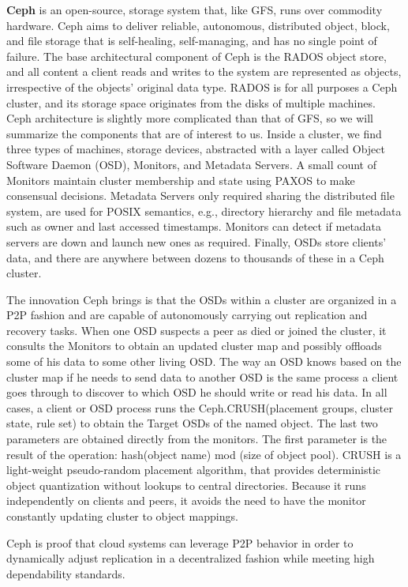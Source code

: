 \documentclass[runningheads]{llncs}
\begin{document}
\textbf{Ceph} is an open-source, storage system that, like GFS, runs over commodity hardware. Ceph aims to deliver reliable, autonomous, distributed object, block, and file storage that is self-healing, self-managing, and has no single point of failure. The base architectural component of Ceph is the RADOS object store, and all content a client reads and writes to the system are represented as objects, irrespective of the objects' original data type. RADOS is for all purposes a Ceph cluster, and its storage space originates from the disks of multiple machines. Ceph architecture is slightly more complicated than that of GFS, so we will summarize the components that are of interest to us. Inside a cluster, we find three types of machines, storage devices, abstracted with a layer called Object Software Daemon (OSD), Monitors, and Metadata Servers. A small count of Monitors maintain cluster membership and state using PAXOS \cite{paxos} to make consensual decisions. Metadata Servers only required sharing the distributed file system, are used for POSIX semantics, e.g., directory hierarchy and file metadata such as owner and last accessed timestamps. Monitors can detect if metadata servers are down and launch new ones as required. Finally, OSDs store clients' data, and there are anywhere between dozens to thousands of these in a Ceph cluster.

The innovation Ceph brings is that the OSDs within a cluster are organized in a P2P fashion and are capable of autonomously carrying out replication and recovery tasks. When one OSD suspects a peer as died or joined the cluster, it consults the Monitors to obtain an updated cluster map and possibly offloads some of his data to some other living OSD. The way an OSD knows based on the cluster map if he needs to send data to another OSD is the same process a client goes through to discover to which OSD he should write or read his data. In all cases, a client or OSD process runs the Ceph.CRUSH(placement groups, cluster state, rule set) to obtain the Target OSDs of the named object. The last two parameters are obtained directly from the monitors. The first parameter is the result of the operation: hash(object name) mod (size of object pool). CRUSH \cite{crush} is a light-weight pseudo-random placement algorithm, that provides deterministic object quantization without lookups to central directories. Because it runs independently on clients and peers, it avoids the need to have the monitor constantly updating cluster to object mappings.

Ceph is proof that cloud systems can leverage P2P behavior in order to dynamically adjust replication in a decentralized fashion while meeting high dependability standards. \cite{ceph, ceph_benchmarks}
\end{document}
